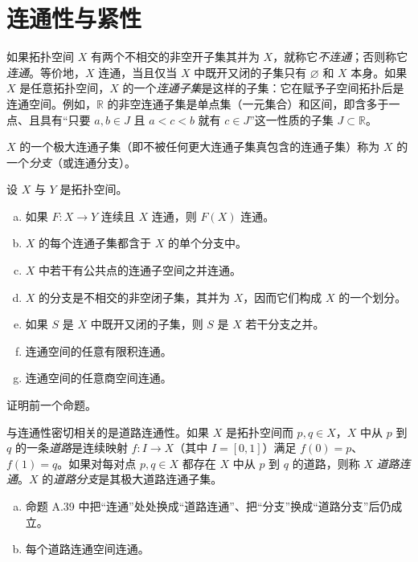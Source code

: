 \documentclass[../../main.tex]{subfiles}
\begin{document}
\section{连通性与紧性}\label{section:appA-connectedness-compactness}

如果拓扑空间 $X$ 有两个不相交的非空开子集其并为 $X$，就称它\emph{不连通}；否则称它\emph{连通}。等价地，$X$ 连通，当且仅当 $X$ 中既开又闭的子集只有 $\varnothing$ 和 $X$ 本身。如果 $X$ 是任意拓扑空间，$X$ 的一个\emph{连通子集}是这样的子集：它在赋予子空间拓扑后是连通空间。例如，$\mathbb R$ 的非空连通子集是单点集（一元集合）和区间，即含多于一点、且具有“只要 $a,b\in J$ 且 $a<c<b$ 就有 $c\in J$”这一性质的子集 $J\subset\mathbb R$。

$X$ 的一个极大连通子集（即不被任何更大连通子集真包含的连通子集）称为 $X$ 的一个\emph{分支}（或连通分支）。

\begin{proposition}[连通空间的性质]\label{proposition:appA-connected-properties}
设 $X$ 与 $Y$ 是拓扑空间。
\begin{enumerate}[(a)]
\item 如果 $F:X\to Y$ 连续且 $X$ 连通，则 $F(X)$ 连通。
\item $X$ 的每个连通子集都含于 $X$ 的单个分支中。
\item $X$ 中若干有公共点的连通子空间之并连通。
\item $X$ 的分支是不相交的非空闭子集，其并为 $X$，因而它们构成 $X$ 的一个划分。
\item 如果 $S$ 是 $X$ 中既开又闭的子集，则 $S$ 是 $X$ 若干分支之并。
\item 连通空间的任意有限积连通。
\item 连通空间的任意商空间连通。
\end{enumerate}
\end{proposition}

\begin{exercise}\label{exercise:appA-A-40}
证明前一个命题。
\end{exercise}

与连通性密切相关的是道路连通性。如果 $X$ 是拓扑空间而 $p,q\in X$，$X$ 中从 $p$ 到 $q$ 的一条\emph{道路}是连续映射 $f:I\to X$（其中 $I=[0,1]$）满足 $f(0)=p$、$f(1)=q$。如果对每对点 $p,q\in X$ 都存在 $X$ 中从 $p$ 到 $q$ 的道路，则称 $X$ \emph{道路连通}。$X$ 的\emph{道路分支}是其极大道路连通子集。

\begin{proposition}[道路连通空间的性质]\label{proposition:appA-path-connected-properties}
\begin{enumerate}[(a)]
\item 命题 A.39 中把“连通”处处换成“道路连通”、把“分支”换成“道路分支”后仍成立。
\item 每个道路连通空间连通。
\end{enumerate}
\end{proposition}
\end{document}
